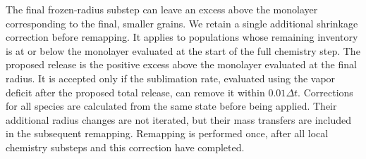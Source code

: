 The final frozen-radius substep can leave an excess above the
monolayer corresponding to the final, smaller grains. We retain a
single additional shrinkage correction before remapping. It applies
to populations whose remaining inventory is at or below the
monolayer evaluated at the start of the full chemistry step. The
proposed release is the positive excess above the monolayer evaluated
at the final radius. It is accepted only if the sublimation rate,
evaluated using the vapor deficit after the proposed total release,
can remove it within $0.01\Delta t$. Corrections for all species are
calculated from the same state before being applied. Their additional
radius changes are not iterated, but their mass transfers are included
in the subsequent remapping. Remapping is performed once, after all
local chemistry substeps and this correction have completed.
